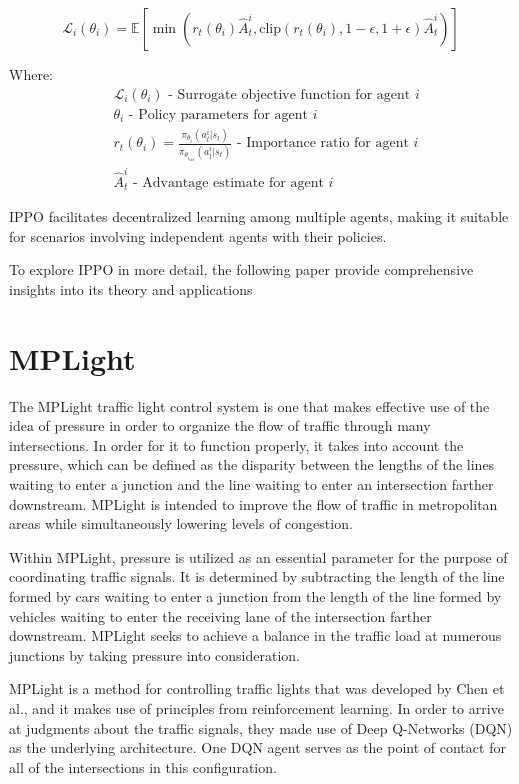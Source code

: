 \[
\mathcal{L}_i(\theta_i) = \mathbb{E}\left[\min\left(r_t(\theta_i)\hat{A}_t^i, \text{clip}\left(r_t(\theta_i), 1-\epsilon, 1+\epsilon\right)\hat{A}_t^i\right)\right]
\]

Where:
\begin{align*}
    &\mathcal{L}_i(\theta_i) \text{ - Surrogate objective function for agent } i\\
    &\theta_i \text{ - Policy parameters for agent } i\\
    &r_t(\theta_i) = \frac{\pi_{\theta_i}(a_t^i|s_t)}{\pi_{\theta_{i_{\text{old}}}}(a_t^i|s_t)} \text{ - Importance ratio for agent } i\\
    &\hat{A}_t^i \text{ - Advantage estimate for agent } i
\end{align*}

IPPO facilitates decentralized learning among multiple agents, making it suitable for scenarios involving independent agents with their policies.


To explore IPPO in more detail, the following paper\cite{ault2020learning} provide comprehensive insights into its theory and applications


\section{MPLight}\label{sec:MPLight}
The MPLight\cite{chen2020toward} traffic light control system is one that makes effective use of the idea of pressure in order to organize the flow of traffic through many intersections. In order for it to function properly, it takes into account the pressure, which can be defined as the disparity between the lengths of the lines waiting to enter a junction and the line waiting to enter an intersection farther downstream. MPLight is intended to improve the flow of traffic in metropolitan areas while simultaneously lowering levels of congestion.

Within MPLight, pressure is utilized as an essential parameter for the purpose of coordinating traffic signals. It is determined by subtracting the length of the line formed by cars waiting to enter a junction from the length of the line formed by vehicles waiting to enter the receiving lane of the intersection farther downstream. MPLight seeks to achieve a balance in the traffic load at numerous junctions by taking pressure into consideration.

MPLight is a method for controlling traffic lights that was developed by Chen et al., and it makes use of principles from reinforcement learning. In order to arrive at judgments about the traffic signals, they made use of Deep Q-Networks (DQN) as the underlying architecture. One DQN agent serves as the point of contact for all of the intersections in this configuration.

